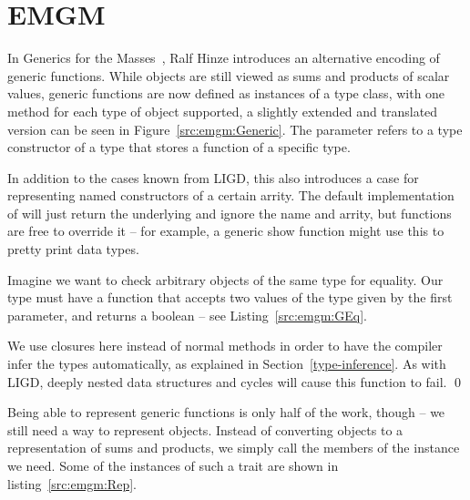 \section{EMGM}


In Generics for the Masses~\cite{GM}, Ralf Hinze introduces an alternative
encoding of generic functions. While objects are still viewed as sums and
products of scalar values, generic functions are now defined as instances
of a  type class, with one method for each type of object
supported, a slightly extended and translated version can be seen in Figure~\ref{src:emgm:Generic}.
The parameter  refers to a type constructor of a type that stores
a function of a specific type.



In addition to the cases known from LIGD, this also introduces a 
case for representing named constructors of a certain arrity. The default
implementation of  will just return the underlying  and
ignore the name and arrity, but functions are free to override it -- for example,
a generic show function might use this to pretty print data types.

\begin{example}
Imagine we want to check arbitrary objects of the same type for equality.
Our type  must have a function that accepts two
values of the type given by the first parameter, and returns a boolean
-- see Listing~\ref{src:emgm:GEq}.


We use closures here instead of normal methods in order to have the
compiler infer the types automatically, as explained in Section~\ref{type-inference}.
As with LIGD, deeply nested data structures and cycles will cause this
function to fail. \qed{}
\end{example}

Being able to represent generic functions is only half of the work, though
-- we still need a way to represent objects. Instead of converting objects
to a representation of sums and products, we simply call the members of
the  instance we need. Some of the instances of such a 
trait are shown in listing~\ref{src:emgm:Rep}.



